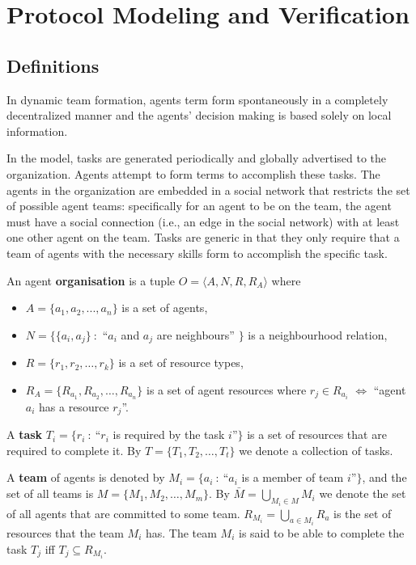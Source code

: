 \documentclass{llncs}
\begin{document}
\section{Protocol Modeling and Verification}

\subsection{Definitions}

\cite{gaston2005agent}
In dynamic team formation, agents term form spontaneously in a completely decentralized manner and the agents' decision making is based solely on local information.

In the model, tasks are generated periodically and globally advertised to the organization. Agents attempt to form terms to accomplish these tasks. The agents in the organization are embedded in a social network that restricts the set of possible agent teams: specifically for an agent to be on the team, the agent must have a social connection (i.e., an edge in the social network) with at least one other agent on the team. Tasks are generic in that they only require that a team of agents with the necessary skills form to accomplish the specific task.

\begin{definition}
An agent \textbf{organisation} is a tuple $O=\langle A, N, R, R_A  \rangle$ where
\noindent
\begin{itemize}
\item $A= \{ a_1,a_2,...,a_n \} $ is a set of agents,
\item $N=\{\{a_i,a_j \}\ :$ ``$a_i$ and $a_j$ are neighbours'' $\}$ is a neighbourhood relation,
\item $R=\{r_1,r_2,\dots,r_k\}$ is a set of resource types,
\item $R_A=\{R_{a_1}, R_{a_2}, \dots, R_{a_n}\}$ is a set of agent resources where $r_j \in R_{a_i} $ $\iff$ ``agent $a_i$ has a resource $r_j$''.
\end{itemize}
\end{definition}

\begin{definition}
A \textbf{task} $T_i=\{r_i\ :\ $``$r_i$ is required by the task $i$''$\}$ is a set of resources that are required to complete it. By $T=\{T_1, T_2,\dots, T_t\}$ we denote a collection of tasks.
\end{definition}

\begin{definition}
A \textbf{team} of agents is denoted by $M_i=\{a_i\ :\ $``$a_i$ is a member of team $i$''$\}$, and the set of all teams is $M=\{M_1, M_2,\dots , M_m\}$. By $\bar{M} = \bigcup_{M_i \in M} M_i$ we denote the set of all agents that are committed to some team. $R_{M_i}=\bigcup_{a \in M_i}R_{a}$ is the set of resources that the team $M_i$ has. The team $M_i$ is said to be able to complete the task $T_j$ iff $T_j \subseteq R_{M_i}$.
\end{definition}
\end{document}
